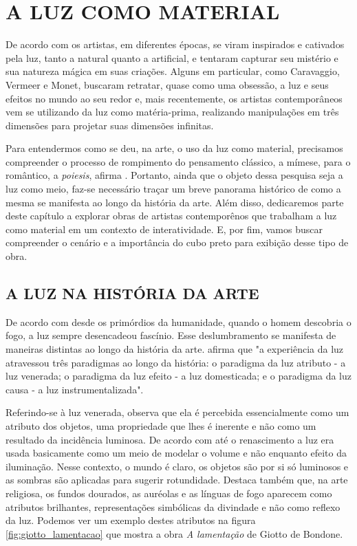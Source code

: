 \chapter{A LUZ COMO MATERIAL}

De acordo com  os artistas, em diferentes épocas, se viram inspirados e cativados pela luz, tanto a natural quanto a artificial, e tentaram capturar seu mistério e sua natureza mágica em suas criações. Alguns em particular, como Caravaggio, Vermeer e Monet, buscaram retratar, quase como uma obsessão, a luz e seus efeitos no mundo ao seu redor e, mais recentemente, os artistas contemporâneos vem se utilizando da luz como matéria-prima, realizando manipulações em três dimensões para projetar suas dimensões infinitas. 

Para entendermos como se deu, na arte, o uso da luz como material, precisamos compreender o processo de rompimento do pensamento clássico, a mímese, para o romântico, a \textit{poiesis}, afirma . Portanto, ainda que o objeto dessa pesquisa seja a luz como meio, faz-se necessário traçar um breve panorama histórico de como a mesma se manifesta ao longo da história da arte. Além disso, dedicaremos parte deste capítulo a explorar obras de artistas contemporênos que trabalham a luz como material em um contexto de interatividade. E, por fim, vamos buscar compreender o cenário e a importância do cubo preto para exibição desse tipo de obra.


\section{A LUZ NA HISTÓRIA DA ARTE}

De acordo com   desde os primórdios da humanidade, quando o homem descobria o fogo, a luz sempre desencadeou fascínio. Esse deslumbramento se manifesta de maneiras distintas ao longo da história da arte.  afirma que "a experiência da luz atravessou três paradigmas ao longo da história: o paradigma da luz atributo - a luz venerada; o paradigma da luz efeito - a luz domesticada; e o paradigma da luz causa - a luz instrumentalizada".

Referindo-se à luz venerada,  observa que ela é percebida essencialmente como um atributo dos objetos, uma propriedade que lhes é inerente e não como um resultado da incidência luminosa. De acordo com  até o renascimento a luz era usada basicamente como um meio de modelar o volume e não enquanto efeito da iluminação. Nesse contexto, o mundo é claro, os objetos são por si só luminosos e as sombras são aplicadas para sugerir rotundidade. Destaca também que, na arte religiosa, os fundos dourados, as auréolas e as línguas de fogo aparecem como atributos brilhantes, representações simbólicas da divindade e não como reflexo da luz. Podemos ver um exemplo destes atributos na figura \ref{fig:giotto_lamentacao} que mostra a obra \textit{A lamentação} de Giotto de Bondone.

